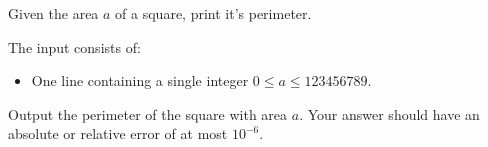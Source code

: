 \problemname{\problemyamlname}


\newcommand{\maxa}{123456789}

Given the area $a$ of a square, print it's perimeter.

\begin{Input}
	The input consists of:
	\begin{itemize}
		\item One line containing a single integer $0\leq a\leq \maxa$.
	\end{itemize}
\end{Input}

\begin{Output}
	Output the perimeter of the square with area $a$.
	Your answer should have an absolute or relative error of at most $10^{-6}$.
\end{Output}

